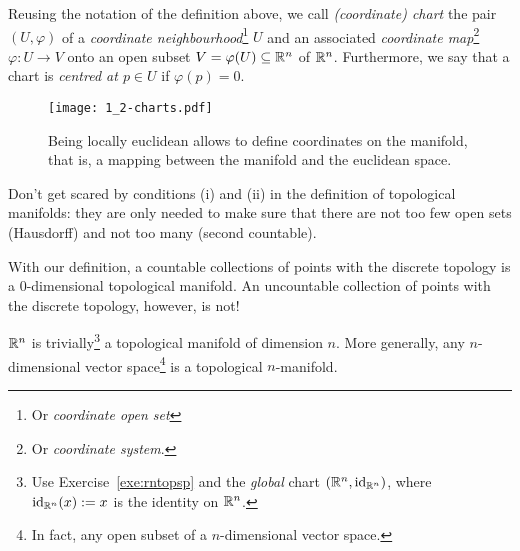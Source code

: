 \begin{notation}\label{def:coords_obj}
	Reusing the notation of the definition above, we call \emph{(coordinate) chart} the pair $(U, \varphi)$ of a \emph{coordinate neighbourhood}\footnote{Or \emph{coordinate open set}} $U$ and an associated \emph{coordinate map}\footnote{Or \emph{coordinate system}.} $\varphi: U\to V$ onto an open subset $V=\varphi(U)\subseteq\mathbb{R}^n$ of $\mathbb{R}^n$.
	Furthermore, we say that a chart is \emph{centred at $p\in U$} if $\varphi(p) = 0$.
\end{notation}

\begin{figure}[htp]
	\centering
	\texttt{[image: 1\_2-charts.pdf]}
	\caption{Being locally euclidean allows to define coordinates on the manifold, that is, a mapping between the manifold and the euclidean space.}
	\label{fig:1.2-charts}
\end{figure}

Don't get scared by conditions (i) and (ii) in the definition of topological manifolds: they are only needed to make sure that there are not too few open sets (Hausdorff) and not too many (second countable).

\begin{example}
	With our definition, a countable collections of points with the discrete topology is a $0$-dimensional topological manifold.
	An uncountable collection of points with the discrete topology, however, is not!
\end{example}

\begin{example}
	$\mathbb{R}^n$ is trivially\footnote{Use Exercise~\ref{exe:rntopsp} and the \emph{global} chart $(\mathbb{R}^n, \operatorname{id}_{\mathbb{R}^n})$, where $\operatorname{id}_{\mathbb{R}^n}(x) := x$ is the identity on $\mathbb{R}^n$.} a topological manifold of dimension $n$.
	More generally, any $n$-dimensional vector space\footnote{In fact, any open subset of a $n$-dimensional vector space.} is a topological $n$-manifold.
\end{example}

